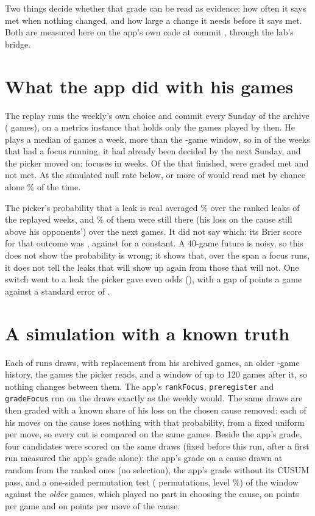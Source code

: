\documentclass[11pt]{article}
\begin{document}
Two things decide whether that grade can be read as evidence: how often it says met when
nothing changed, and how large a change it needs before it says met. Both are measured here on
the app's own code at commit \texttt{\AppCommit}, through the lab's bridge.

\section{What the app did with his games}

The replay runs the weekly's own choice and commit every Sunday of the archive
(\ArchiveGames{} games), on a metrics instance that holds only the games played by then. He plays
a median of \GamesPerWeek{} games a week, more than the \Window-game window, so in \Filled{} of the
\Graded{} weeks that had a focus running, it had already been decided by the next Sunday, and the
picker moved on: \Focuses{} focuses in \Weeks{} weeks. Of the \Finished{} that finished, \Met{}
were graded met and \NotMet{} not met. At the simulated null rate below, \Met{} or more of
\Finished{} would read met by chance alone \ChanceOfMet\% of the time.

The picker's probability that a leak is real averaged \MeanReal\% over the \Pairs{} ranked leaks
of the replayed weeks, and \StillThere\% of them were still there (his loss on the cause still
above his opponents') over the next \Window{} games. It did not say which: its Brier score for
that outcome was \BrierReal, against \BrierBase{} for a constant. A 40-game future is noisy, so
this does not show the probability is wrong; it shows that, over the span a focus runs, it does
not tell the leaks that will show up again from those that will not. One switch went to a leak
the picker gave even odds (\WeakestReal), with a gap of \WeakestGap{} points a game against a
standard error of \WeakestSe.

\section{A simulation with a known truth}

Each of \Runs{} runs draws, with replacement from his \Pool{} archived games, an older
\Baseline-game history, the \Baseline{} games the picker reads, and a window of up to 120 games
after it, so nothing changes between them. The app's \texttt{rankFocus}, \texttt{preregister} and
\texttt{gradeFocus} run on the draws exactly as the weekly would. The same draws are then graded
with a known share of his loss on the chosen cause removed: each of his moves on the cause loses
nothing with that probability, from a fixed uniform per move, so every cut is compared on the
same games. Beside the app's grade, four candidates were scored on the same draws (fixed before
this run, after a first run measured the app's grade alone): the app's grade on a cause drawn at
random from the ranked ones (no selection), the app's grade without its CUSUM pass, and a
one-sided permutation test (\Perms{} permutations, level \Level\%) of the window against the
\emph{older} games, which played no part in choosing the cause, on points per game and on points
per move of the cause.
\end{document}
